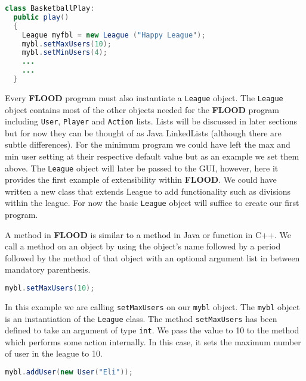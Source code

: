 \documentclass[12pt]{report}
\begin{document}
\begin{singlespace}
\begin{lstlisting}[language=Java,label=some-code,caption=BasketballPlay.fld]
class BasketballPlay:
  public play()
  {
    League myfbl = new League ("Happy League");
    mybl.setMaxUsers(10);
    mybl.setMinUsers(4);
    ...
    ...
  }
\end{lstlisting}
\end{singlespace}

Every \textbf{FLOOD} program must also instantiate a \texttt{League} object. The \texttt{League} object contains most of the other objects needed for the \textbf{FLOOD} program including \texttt{User}, \texttt{Player} and \texttt{Action} lists. Lists will be discussed in later sections but for now they can be thought of as Java LinkedLists (although there are subtle differences). For the minimum program we could have left the max and min user setting at their respective default value but as an example we set them above. The \texttt{League} object will later be passed to the GUI, however, here it provides the first example of extensibility within \textbf{FLOOD}. We could have written a new class that extends League to add functionality such as divisions within the league. For now the basic \texttt{League} object will suffice to create our first program.

A method in \textbf{FLOOD} is similar to a method in Java or function in C++. We call a method on an object by using the object's name followed by a period followed by the method of that object with an optional argument list in between mandatory parenthesis.

\begin{singlespace}
\begin{lstlisting}[language=Java,label=some-code,caption=Setting the maximum number of users]
mybl.setMaxUsers(10);
\end{lstlisting}
\end{singlespace}

In this example we are calling \texttt{setMaxUsers} on our \texttt{mybl} object. The \texttt{mybl} object is an instantiation of the \texttt{League} class. The method \texttt{setMaxUsers} has been defined to take an argument of type \texttt{int}. We pass the value to 10 to the method which performs some action internally. In this case, it sets the maximum number of user in the league to 10.

\begin{singlespace}
\begin{lstlisting}[language=Java,label=some-code,caption=Adding a new User]
mybl.addUser(new User("Eli"));
\end{lstlisting}
\end{singlespace}
\end{document}
